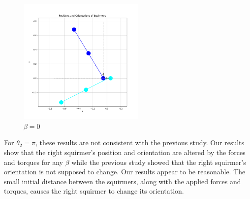 \documentclass{article}
\begin{document}
\begin{figure}[H]
    \centering
    \includegraphics[width=0.55\textwidth]{graphs/simulations/sim_sq_sq/beta0/pi_.png}
    \caption{\footnotesize $\beta = 0$}
\end{figure}
For $\theta_2 = \pi$, these results are not consistent with the previous study\cite{Stark}. 
Our results show that the right squirmer's position
and orientation are altered by the forces and torques for any $\beta$ while the previous study showed that the right squirmer's
orientation is not supposed to change. Our results appear to be reasonable. The small initial 
distance between the squirmers, along with the applied forces and torques, causes the right 
squirmer to change its orientation.
\end{document}
